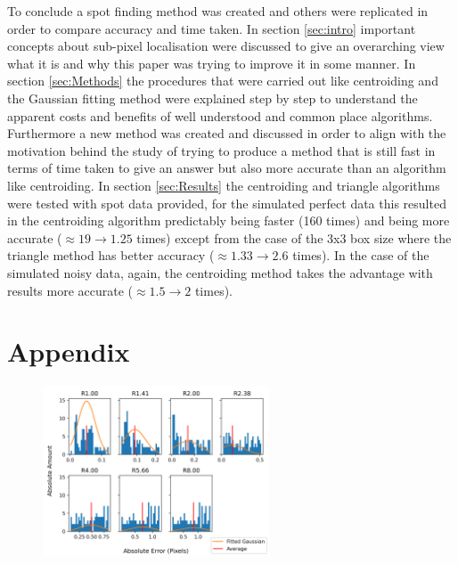 \documentclass[aps,pra,a4paper,nofootinbib,onecolumn,tightenlines,longbibliography,12pt,amsfonts,amssymb,amsmath,floatfix]{revtex4-2} %
\begin{document}
  To conclude a spot finding method was created and others were replicated in order to compare 
  accuracy and time taken. In section \ref{sec:intro} important concepts about sub-pixel localisation 
  were discussed to give an overarching view what it is and why this paper was trying to improve it 
  in some manner. In section \ref{sec:Methods} the procedures that were carried out like centroiding 
  and the Gaussian fitting method were explained step by step to understand the apparent costs and benefits 
  of well understood and common place algorithms. Furthermore a new method was created and discussed in order 
  to align with the motivation behind the study of trying to produce a method that is still fast in terms 
  of time taken to give an answer but also more accurate than an algorithm like centroiding. In section \ref{sec:Results}
  the centroiding and triangle algorithms were tested with spot data provided, for the simulated perfect data this resulted 
  in the centroiding algorithm predictably being faster (160 times) and being more accurate ($\approx 19\rightarrow 1.25$ times) 
  except from the case of the 3x3 box size where the triangle method has better accuracy ($\approx 1.33\rightarrow 2.6$ times).
  In the case of the simulated noisy data, again, the centroiding method takes the advantage with results more 
  accurate ($\approx 1.5\rightarrow 2$ times).
  




\newpage


\newpage
\appendix

\section{Appendix}
\label{sec:appendix}

  \begin{figure}[H]
    \begin{center}
      \includegraphics[width=0.6\textwidth]{project_pics/distro_centriod_5.png}
    \end{center}
    \caption{}
    \label{fig:box_5}
  \end{figure}
\end{document}
